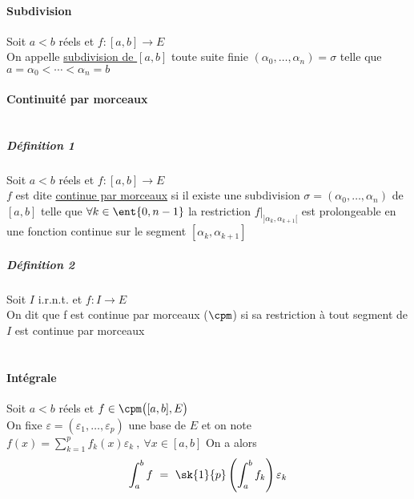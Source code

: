 {    \paragraph{Subdivision}
        Soit $a<b$ réels et $f:[a,b]\rightarrow E$ 
        \\ On appelle \underline{subdivision de $[a,b]$} toute suite finie $(\alpha_0 , \dots , \alpha_n ) = \sigma$ telle que 
        $a=\alpha_0 < \cdots <\alpha_n = b$\trait \vspace*{-1cm}
    \paragraph{Continuité par morceaux}
    ${}$\vspace{-0.7cm}\\\traitd
    \subparagraph{Définition 1}
        Soit $a<b$ réels et $f:[a,b]\rightarrow E$ 
        \\ $f$ est dite \underline{continue par morceaux} si il existe une subdivision $\sigma = (\alpha_0 ,\dots ,\alpha_n)$ de $[a,b]$ 
        telle que $\forall k\in \ent{0,n-1}$ la restriction $f|_{]\alpha_k , \alpha_{k+1}[} $ est prolongeable en une fonction continue sur le 
        segment $[\alpha_k , \alpha_{k+1}]$ \trait \newpage \traitd
    \subparagraph{Définition 2}
        Soit $I$ i.r.n.t. et $f:I\rightarrow E$ \\
        On dit que f est continue par morceaux ($\cpm$) si sa restriction à tout segment de $I$ est continue par morceaux \trait
    \vspace*{0.5cm} \\  \\ \traitd
    \paragraph{Intégrale}
        Soit $a<b$ réels et $f\in\cpm \big( [a,b],E \big)$ \\On fixe $\varepsilon = (\varepsilon_1 , \dots , \varepsilon_p)$ une base de $E$ et
        on note $f(x) = \sum_{k=1}^p f_k(x) \varepsilon_k ~,~\forall x\in [a,b]$ On a alors 
        \[ \int_a^b f ~=~ \sk{1}{p} \left( \int_a^b f_k \right) \varepsilon_k \] \vspace*{-0.7cm}\trait
}
